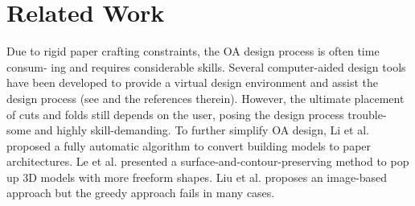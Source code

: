 \section{Related Work}

Due to rigid paper crafting constraints, the OA design process is often time consum- ing and requires considerable skills. Several computer-aided design tools have been developed to provide a virtual design environment and assist the design process (see \cite{mitani2004computer} and the references therein). However, the ultimate placement of cuts and folds still depends on the user, posing the design process trouble- some and highly skill-demanding. To further simplify OA design, Li et al.~\cite{li2010popup} proposed a fully automatic algorithm to convert building models to paper architectures. Le et al.\cite{le2014surface} presented a surface-and-contour-preserving method to pop up 3D models with more freeform shapes. Liu et al.\cite{liu2014image} proposes an image-based approach but the greedy approach fails in many cases.